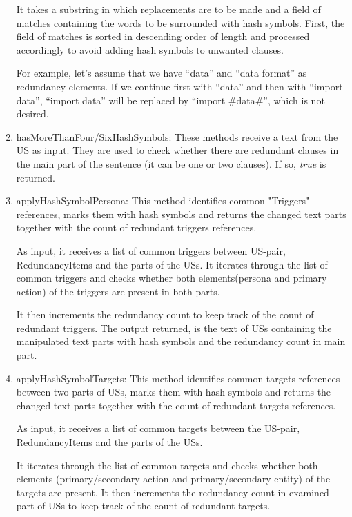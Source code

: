 \begin{enumerate}
	It takes a substring in which replacements are to be made and a field of matches containing the words to be surrounded with hash symbols. First, the field of matches is sorted in descending order of length and processed accordingly to avoid adding hash symbols to unwanted clauses. 
	\begin{example}
		For example, let's assume that we have \enquote{data} and \enquote{data format} as redundancy elements. If we continue first with \enquote{data} and then with \enquote{import data}, \enquote{import data} will be replaced by \enquote{import \#data\#}, which is not desired.
	\end{example}
	\item hasMoreThanFour/SixHashSymbols: These methods receive a text from the US as input. They are used to check whether there are redundant clauses in the main part of the sentence (it can be one or two clauses). If so, \textit{true} is returned.
	
	\item applyHashSymbolPersona: This method identifies common "Triggers" references, marks them with hash symbols and returns the changed text parts together with the count of redundant triggers references. 
	
	As input, it receives a list of common triggers between US-pair, RedundancyItems and the parts of the USs. It iterates through the list of common triggers and checks whether both elements(persona and primary action) of the triggers are present in both parts. 
	
	It then increments the redundancy count to keep track of the count of redundant triggers. The output returned, is the text of USs containing the manipulated text parts with hash symbols and the redundancy count in main part.
	
	\item applyHashSymbolTargets: This method identifies common targets references between two parts of USs, marks them with hash symbols and returns the changed text parts together with the count of redundant targets references.
	
	As input, it receives a list of common targets between the US-pair, RedundancyItems and the parts of the USs. 
	
	It iterates through the list of common targets and checks whether both elements (primary/secondary action and primary/secondary entity) of the targets are present. It then increments the redundancy count in examined part of USs to keep track of the count of redundant targets. 
	

\end{enumerate}
